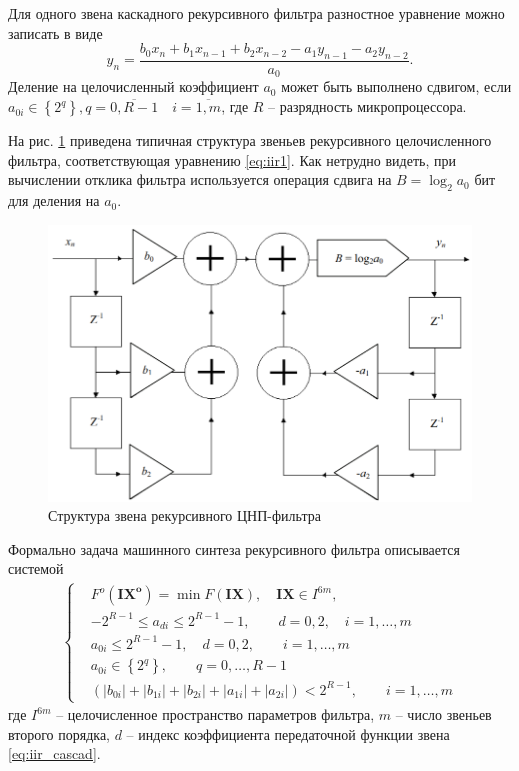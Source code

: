 Для одного звена каскадного рекурсивного фильтра разностное уравнение можно записать в виде
\begin{equation}
  y_{n}=\frac{b_{0} x_{n}+b_{1} x_{n-1}+b_{2} x_{n-2}-a_{1} y_{n-1}-a_{2} y_{n-2}}{a_{0}}.
  \label{eq:iir1}
\end{equation}
Деление на целочисленный коэффициент $a_0$ может быть выполнено сдвигом, если $a_{0 i} \in\left\{2^{q}\right\}, q=\overline{0, R-1} \quad i=\overline{1, m}$, где $R$ -- разрядность микропроцессора.

На рис. \ref{fig:figure1} приведена типичная структура звеньев рекурсивного целочисленного фильтра, соответствующая уравнению \eqref{eq:iir1}. Как нетрудно видеть, при вычислении отклика фильтра используется операция сдвига на $B=\log_2a_0$ бит для деления на $a_0$.

\begin{figure}[H]
  \centering
  \includegraphics[width=\textwidth]{imgs/img1}
  \caption{Структура звена рекурсивного ЦНП-фильтра}
  \label{fig:figure1}
\end{figure}

Формально задача машинного синтеза рекурсивного фильтра описывается системой
\begin{gather}
\left\{\begin{aligned}
  &F^{o}\left(\boldsymbol{I X}^{\boldsymbol{o}}\right)=
    \min F(\boldsymbol{I X}),  \quad
      \boldsymbol{I X} \in I^{6 m},\\
  &-2^{R-1} \leq a_{d i} \leq 2^{R-1}-1, \quad \quad d=0,2, \quad i=1,\ldots,m\\
  &a_{0 i} \leq 2^{R-1}-1, \quad d=0,2, \quad \quad i=1,\ldots,m\\
  &a_{0 i} \in\left\{2^{q}\right\}, \quad \quad q=0,\ldots,R-1\\
  &\left(\left|b_{0 i}\right|+\left|b_{1 i}\right|+\left|b_{2 i}\right|+\left|a_{1 i}\right|+\left|a_{2 i}\right|\right)<2^{R-1}, \quad \quad i=1,\ldots,m
\end{aligned}\right.
\end{gather}
где $I^{6m}$ -- целочисленное пространство параметров фильтра, $m$ -- число звеньев второго порядка, $d$ -- индекс
коэффициента передаточной функции звена \eqref{eq:iir_cascad}.

